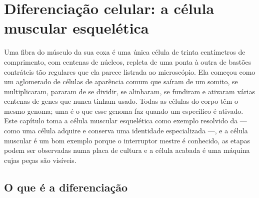 \chapter{Diferenciação celular: a célula muscular esquelética}\label{ch:b2:cell-differentiation}

Uma fibra do músculo da sua coxa é uma única célula de trinta
centímetros de comprimento, com centenas de núcleos, repleta de uma
ponta à outra de bastões contráteis tão regulares que ela parece
listrada ao microscópio. Ela começou como um aglomerado de células de
aparência comum que saíram de um somito, se multiplicaram, pararam de
se dividir, se alinharam, se fundiram e ativaram várias centenas de
genes que nunca tinham usado. Todas as células do corpo têm o mesmo
genoma; uma  é o que esse genoma faz quando um  específico é ativado. Este capítulo toma a célula muscular
esquelética como exemplo resolvido da \emph{} --- como uma
célula adquire e conserva uma identidade especializada ---, e a célula
muscular é um bom exemplo porque o interruptor mestre é conhecido, as
etapas podem ser observadas numa placa de cultura e a célula acabada é
uma máquina cujas peças são visíveis.

\section{O que é a diferenciação}

